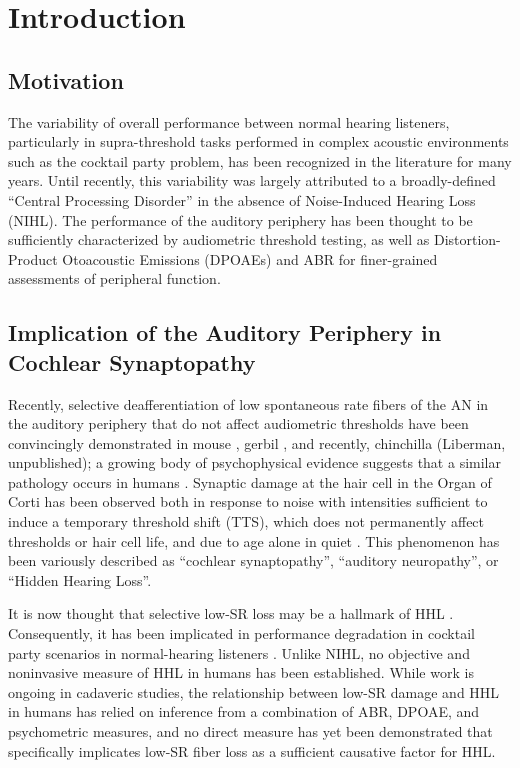 \chapter{Introduction}
\label{chapter:Introduction}
\thispagestyle{myheadings}
\section{Motivation}
The variability of overall performance between normal hearing listeners, particularly in supra-threshold tasks performed in complex acoustic environments such as the cocktail party problem, has been recognized in the literature for many years.  Until recently, this variability was largely attributed to a broadly-defined ``Central Processing Disorder'' in the absence of Noise-Induced Hearing Loss (NIHL). The performance of the auditory periphery has been thought to be sufficiently characterized by audiometric threshold testing, as well as Distortion-Product Otoacoustic Emissions (DPOAEs) and ABR for finer-grained assessments of peripheral function.

\section{Implication of the Auditory Periphery in Cochlear Synaptopathy}
Recently, selective deafferentiation of low spontaneous rate fibers of the AN in the auditory periphery that do not affect audiometric thresholds have been convincingly demonstrated in mouse \citep{Kujawa2009Adding}, gerbil \citep{Furman2013NoiseInduced}, and recently, chinchilla (Liberman, unpublished); a growing body of psychophysical evidence suggests that a similar pathology occurs in humans \citep{Bharadwaj2015Individual}.  Synaptic damage at the hair cell in the Organ of Corti has been observed both in response to noise with intensities sufficient to induce a temporary threshold shift (TTS), which does not permanently affect thresholds or hair cell life, and due to age alone in quiet \citep{Sergeyenko2013AgeRelated,Fernandez2015Aging}. This phenomenon has been variously described as ``cochlear synaptopathy''\citep{Bharadwaj2014Cochlear}, ``auditory neuropathy'', or ``Hidden Hearing Loss''.  

It is now thought that selective low-SR loss may be a hallmark of HHL \citep{Furman2013NoiseInduced,Bharadwaj2014Cochlear,Bharadwaj2015Individual,Schaette2011Tinnitus}. Consequently, it has been implicated in performance degradation in cocktail party scenarios in normal-hearing listeners \citep{Bharadwaj2015Individual,Bharadwaj2014Cochlear}.  Unlike NIHL, no objective and noninvasive measure of HHL in humans has been established.  While work is ongoing in cadaveric studies, the relationship between low-SR damage and HHL in humans has relied on inference from a combination of ABR, DPOAE, and psychometric measures, and no direct measure has yet been demonstrated that specifically implicates low-SR fiber loss as a sufficient causative factor for HHL.

